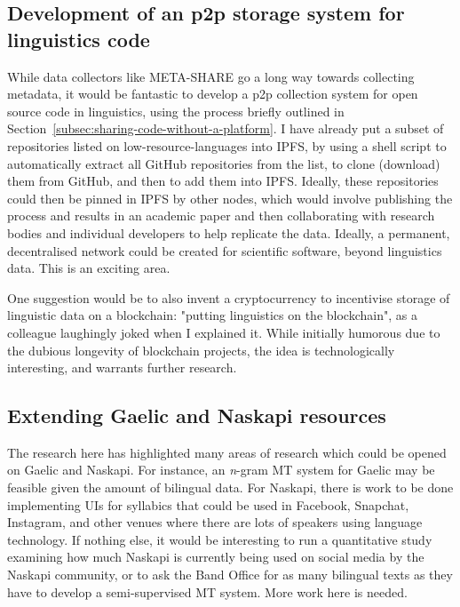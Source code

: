 \subsection{Development of an p2p storage system for linguistics code}

While data collectors like META-SHARE go a long way towards collecting metadata, it would be fantastic to develop a p2p collection system for open source code in linguistics, using the process briefly outlined in Section~\ref{subsec:sharing-code-without-a-platform}. I have already put a subset of repositories listed on low-resource-languages into IPFS, by using a shell script to automatically extract all GitHub repositories from the list, to clone (download) them from GitHub, and then to add them into IPFS. Ideally, these repositories could then be pinned in IPFS by other nodes, which would involve publishing the process and results in an academic paper and then collaborating with research bodies and individual developers to help replicate the data. Ideally, a permanent, decentralised network could be created for scientific software, beyond linguistics data. This is an exciting area.

One suggestion would be to also invent a cryptocurrency to incentivise storage of linguistic data on a blockchain: "putting linguistics on the blockchain", as a colleague laughingly joked when I explained it. While initially humorous due to the dubious longevity of blockchain projects, the idea is technologically interesting, and warrants further research.

\subsection{Extending Gaelic and Naskapi resources}

The research here has highlighted many areas of research which could be opened on Gaelic and Naskapi. For instance, an \textit{n}-gram MT system for Gaelic may be feasible given the amount of bilingual data. For Naskapi, there is work to be done implementing UIs for syllabics that could be used in Facebook, Snapchat, Instagram, and other venues where there are lots of speakers using language technology. If nothing else, it would be interesting to run a quantitative study examining how much Naskapi is currently being used on social media by the Naskapi community, or to ask the Band Office for as many bilingual texts as they have to develop a semi-supervised MT system. More work here is needed.

